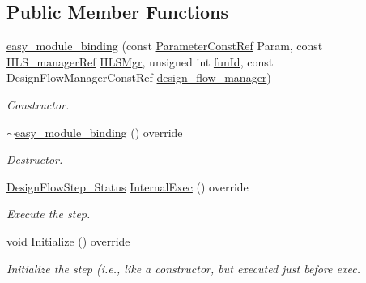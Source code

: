 \subsection*{Public Member Functions}
\begin{DoxyCompactItemize}
\item 
\hyperlink{classeasy__module__binding_a76bb79e104fdca6cea8642102ddda297}{easy\+\_\+module\+\_\+binding} (const \hyperlink{Parameter_8hpp_a37841774a6fcb479b597fdf8955eb4ea}{Parameter\+Const\+Ref} Param, const \hyperlink{hls__manager_8hpp_acd3842b8589fe52c08fc0b2fcc813bfe}{H\+L\+S\+\_\+manager\+Ref} \hyperlink{classHLS__step_ade85003a99d34134418451ddc46a18e9}{H\+L\+S\+Mgr}, unsigned int \hyperlink{classHLSFunctionStep_a3e6434fd86c698b0c70520b859bff5b0}{fun\+Id}, const Design\+Flow\+Manager\+Const\+Ref \hyperlink{classDesignFlowStep_ab770677ddf087613add30024e16a5554}{design\+\_\+flow\+\_\+manager})
\begin{DoxyCompactList}\small\item\em Constructor. \end{DoxyCompactList}\item 
\hyperlink{classeasy__module__binding_ac6a6c816be4fbcde190f813b8e6c5172}{$\sim$easy\+\_\+module\+\_\+binding} () override
\begin{DoxyCompactList}\small\item\em Destructor. \end{DoxyCompactList}\item 
\hyperlink{design__flow__step_8hpp_afb1f0d73069c26076b8d31dbc8ebecdf}{Design\+Flow\+Step\+\_\+\+Status} \hyperlink{classeasy__module__binding_a679ec36974c9d93a34c944f62f7e0170}{Internal\+Exec} () override
\begin{DoxyCompactList}\small\item\em Execute the step. \end{DoxyCompactList}\item 
void \hyperlink{classeasy__module__binding_a965941b4523dc46f21b2fade436d46db}{Initialize} () override
\begin{DoxyCompactList}\small\item\em Initialize the step (i.\+e., like a constructor, but executed just before exec. \end{DoxyCompactList}\end{DoxyCompactItemize}
